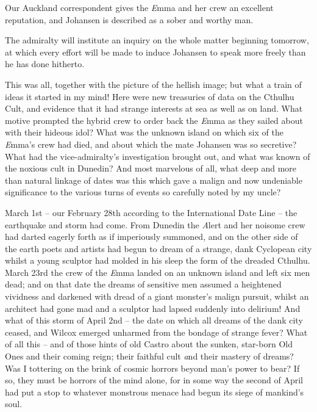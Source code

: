 Our Auckland correspondent gives the {\emph Emma} and her crew an excellent reputation, and Johansen is described as a sober and worthy man.

The admiralty will institute an inquiry on the whole matter beginning tomorrow, at which every effort will be made to induce Johansen to speak more freely than he has done hitherto.
\endblockquote

This was all, together with the picture of the hellish image; but what a train of ideas it started in my mind! Here were new treasuries of data on the Cthulhu Cult, and evidence that it had strange interests at sea as well as on land. What motive prompted the hybrid crew to order back the {\emph Emma} as they sailed about with their hideous idol? What was the unknown island on which six of the {\emph Emma}’s crew had died, and about which the mate Johansen was so secretive? What had the vice-admiralty’s investigation brought out, and what was known of the noxious cult in Dunedin? And most marvelous of all, what deep and more than natural linkage of dates was this which gave a malign and now undeniable significance to the various turns of events so carefully noted by my uncle?

March 1st⁠ – our February 28th according to the International Date Line⁠ – the earthquake and storm had come. From Dunedin the {\emph Alert} and her noisome crew had darted eagerly forth as if imperiously summoned, and on the other side of the earth poets and artists had begun to dream of a strange, dank Cyclopean city whilst a young sculptor had molded in his sleep the form of the dreaded Cthulhu. March 23rd the crew of the {\emph Emma} landed on an unknown island and left six men dead; and on that date the dreams of sensitive men assumed a heightened vividness and darkened with dread of a giant monster’s malign pursuit, whilst an architect had gone mad and a sculptor had lapsed suddenly into delirium! And what of this storm of April 2nd⁠ – the date on which all dreams of the dank city ceased, and Wilcox emerged unharmed from the bondage of strange fever? What of all this⁠ – and of those hints of old Castro about the sunken, star-born Old Ones and their coming reign; their faithful cult {\emph and their mastery of dreams}? Was I tottering on the brink of cosmic horrors beyond man’s power to bear? If so, they must be horrors of the mind alone, for in some way the second of April had put a stop to whatever monstrous menace had begun its siege of mankind’s soul.

\sectionbreak

